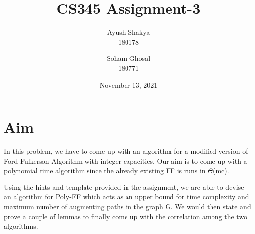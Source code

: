 \documentclass{article}
\title{CS345 Assignment-3}
\author{Ayush Shakya \\180178 \and Soham Ghosal \\180771}
\date{November 13, 2021}
\begin{document}
\maketitle

\vspace{0.25cm}
\section{Aim}
In this problem, we have to come up with an algorithm for a modified version of Ford-Fulkerson Algorithm with integer capacities. Our aim is to come up with a polynomial time algorithm since the already existing FF is runs in $\Theta$(mc).
\par
Using the hints and template provided in the assignment, we are able to devise an algorithm for Poly-FF which acts as an upper bound for time complexity and maximum number of augmenting paths in the graph G. We would then state and prove a couple of lemmas to finally come up with the correlation among the two algorithms.

\vspace{0cm}



\end{document}
